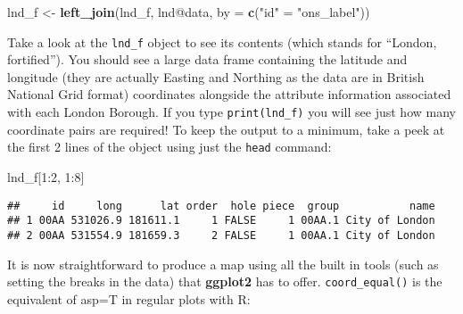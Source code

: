 \documentclass[]{article}
\newenvironment{Shaded}{}{}
\newcommand{\KeywordTok}[1]{\textcolor[rgb]{0.00,0.44,0.13}{\textbf{{#1}}}}
\newcommand{\DataTypeTok}[1]{\textcolor[rgb]{0.56,0.13,0.00}{{#1}}}
\newcommand{\DecValTok}[1]{\textcolor[rgb]{0.25,0.63,0.44}{{#1}}}
\newcommand{\CharTok}[1]{\textcolor[rgb]{0.25,0.44,0.63}{{#1}}}
\newcommand{\StringTok}[1]{\textcolor[rgb]{0.25,0.44,0.63}{{#1}}}
\newcommand{\NormalTok}[1]{{#1}}
\begin{document}
\begin{Shaded}
\begin{Highlighting}[]
\NormalTok{lnd_f <-}\StringTok{ }\KeywordTok{left_join}\NormalTok{(lnd_f, lnd@data, }\DataTypeTok{by =} \KeywordTok{c}\NormalTok{(}\StringTok{"id"} \NormalTok{=}\StringTok{ "ons_label"}\NormalTok{))}
\end{Highlighting}
\end{Shaded}

Take a look at the \texttt{lnd\_f} object to see its contents (which
stands for ``London, fortified''). You should see a large data frame
containing the latitude and longitude (they are actually Easting and
Northing as the data are in British National Grid format) coordinates
alongside the attribute information associated with each London Borough.
If you type \texttt{print(lnd\_f)} you will see just how many coordinate
pairs are required! To keep the output to a minimum, take a peek at the
first 2 lines of the object using just the \texttt{head} command:

\begin{Shaded}
\begin{Highlighting}[]
\NormalTok{lnd_f[}\DecValTok{1}\NormalTok{:}\DecValTok{2}\NormalTok{, }\DecValTok{1}\NormalTok{:}\DecValTok{8}\NormalTok{]}
\end{Highlighting}
\end{Shaded}

\begin{verbatim}
##     id     long      lat order  hole piece  group           name
## 1 00AA 531026.9 181611.1     1 FALSE     1 00AA.1 City of London
## 2 00AA 531554.9 181659.3     2 FALSE     1 00AA.1 City of London
\end{verbatim}

It is now straightforward to produce a map using all the built in tools
(such as setting the breaks in the data) that \textbf{ggplot2} has to
offer. \texttt{coord\_equal()} is the equivalent of asp=T in regular
plots with R:

\begin{Shaded}
\end{Shaded}
\end{document}
